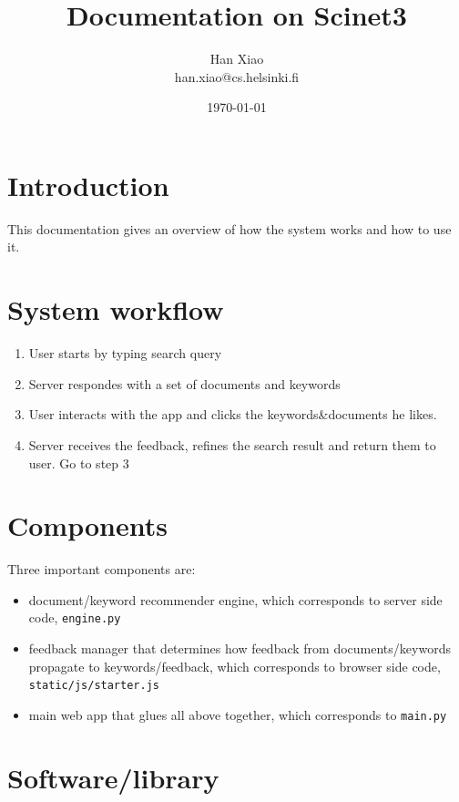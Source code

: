 \documentclass[10pt,a4paper]{article}
\title{Documentation on Scinet3}
\date{\today}
\author{Han Xiao\\ han.xiao@cs.helsinki.fi}
\begin{document}
\maketitle

\tableofcontents
\newpage



\section{Introduction}
This documentation gives an overview of how the system works and how to use it.

\section{System workflow}

\begin{enumerate}
\item User starts by typing search query
\item Server respondes with a set of documents and keywords
\item User interacts with the app and clicks the keywords\&documents he likes. 
\item Server receives the feedback, refines the search result and return them to user. Go to step 3
\end{enumerate}

\section{Components}

Three important components are:

\begin{itemize}
\item document/keyword recommender engine, which corresponds to server side code, \verb+engine.py+
\item feedback manager that determines how feedback from documents/keywords propagate to keywords/feedback, which corresponds to browser side code, \verb+static/js/starter.js+
\item main web app that glues all above together, which corresponds to \verb+main.py+
\end{itemize}


\section{Software/library}
\end{document}
